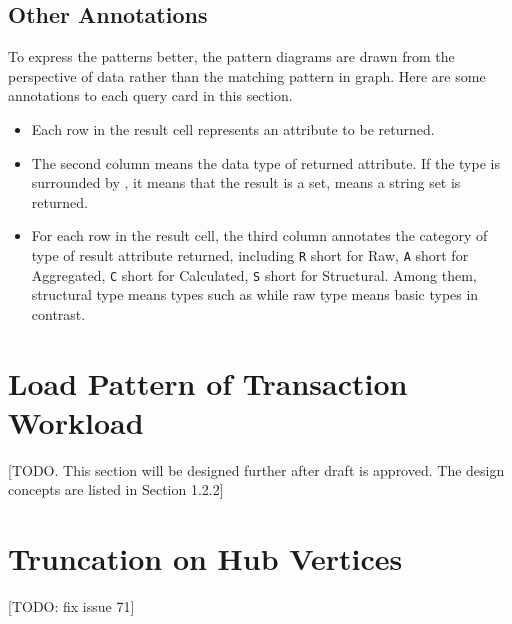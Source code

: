 \subsection{Other Annotations}
\label{subsec:other-annotations}

To express the patterns better, the pattern diagrams are drawn from the perspective
of data rather than the matching pattern in graph. Here are some annotations to each
query card in this section.
\begin{itemize}
    \item Each row in the result cell represents an attribute to be returned.
    \item The second column means the data type of returned attribute.
          If the type is surrounded by \type{\{\}}, it means that the result is a
          set, \eg {} means a string set is returned.
    \item For each row in the result cell, the third column annotates the
          category of type of result attribute returned, including \texttt{R} short
          for Raw, \texttt{A} short for Aggregated, \texttt{C} short for Calculated,
          \texttt{S} short for Structural. Among them, structural type means types
          such as  while raw type means basic types in contrast.
\end{itemize}


\section{Load Pattern of Transaction Workload}
 [TODO. This section will be designed further after draft is approved. The design concepts are listed in Section 1.2.2]


\section{Truncation on Hub Vertices}
[TODO: fix issue 71]

